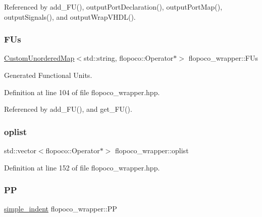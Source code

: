 Referenced by add\+\_\+\+F\+U(), output\+Port\+Declaration(), output\+Port\+Map(), output\+Signals(), and output\+Wrap\+V\+H\+D\+L().

\mbox{\label{classflopoco__wrapper_a6b4e28e7702c15a3b88902608b390776}} 
\subsubsection{\texorpdfstring{F\+Us}{FUs}}
{\footnotesize\ttfamily \hyperlink{custom__map_8hpp_ad1ed68f2ff093683ab1a33522b144adc}{Custom\+Unordered\+Map}$<$std\+::string, flopoco\+::\+Operator$\ast$$>$ flopoco\+\_\+wrapper\+::\+F\+Us\hspace{0.3cm}{\ttfamily [private]}}



Generated Functional Units. 



Definition at line 104 of file flopoco\+\_\+wrapper.\+hpp.



Referenced by add\+\_\+\+F\+U(), and get\+\_\+\+F\+U().

\mbox{\label{classflopoco__wrapper_aae89e35cfb20857850eec60323e5f8a3}} 
\subsubsection{\texorpdfstring{oplist}{oplist}}
{\footnotesize\ttfamily std\+::vector$<$flopoco\+::\+Operator$\ast$$>$ flopoco\+\_\+wrapper\+::oplist\hspace{0.3cm}{\ttfamily [private]}}



Definition at line 152 of file flopoco\+\_\+wrapper.\+hpp.

\mbox{\label{classflopoco__wrapper_ac82c51dbab511806a11535b78b7c106e}} 
\subsubsection{\texorpdfstring{PP}{PP}}
{\footnotesize\ttfamily \hyperlink{classsimple__indent}{simple\+\_\+indent} flopoco\+\_\+wrapper\+::\+PP\hspace{0.3cm}{\ttfamily [private]}}



